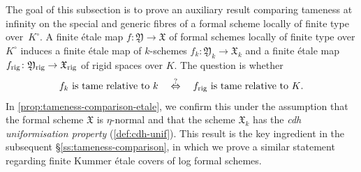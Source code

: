 \documentclass[a4paper,twoside,11pt,reqno]{amsart}
\newcommand{\fX}{{\mathfrak{X}}}
\newcommand{\fY}{{\mathfrak{Y}}}
\theoremstyle{definition}
\numberwithin{equation}{subsection}
\begin{document}
The goal of this subsection is to prove an auxiliary result comparing tameness at infinity on the special and generic fibres of a formal scheme locally of finite type over~$K^\circ$. A finite \'etale map $f\colon \fY\to \fX$ of formal schemes locally of finite type over $K^\circ$ induces a finite \'etale map of $k$-schemes $f_k\colon \fY_k\to \fX_k$ and a finite \'etale map $f_{\rm rig}\colon \fY_{\rm rig}\to \fX_{\rm rig}$ of rigid spaces over $K$. The question is whether 
\[
    \text{$f_k$ is tame relative to $k$} \quad\overset{?}{\Leftrightarrow}\quad \text{$f_{\rm rig}$ is tame relative to $K$.}
\]
In \cref{prop:tameness-comparison-etale}, we confirm this under the assumption that the formal scheme $\fX$ is $\eta$-normal and that the scheme $\fX_k$ has the \emph{cdh uniformisation property} (\cref{def:cdh-unif}). This result is the key ingredient in the subsequent \S\ref{ss:tameness-comparison}, in which we prove a similar statement regarding finite Kummer \'etale covers of log formal schemes. 
\end{document}
